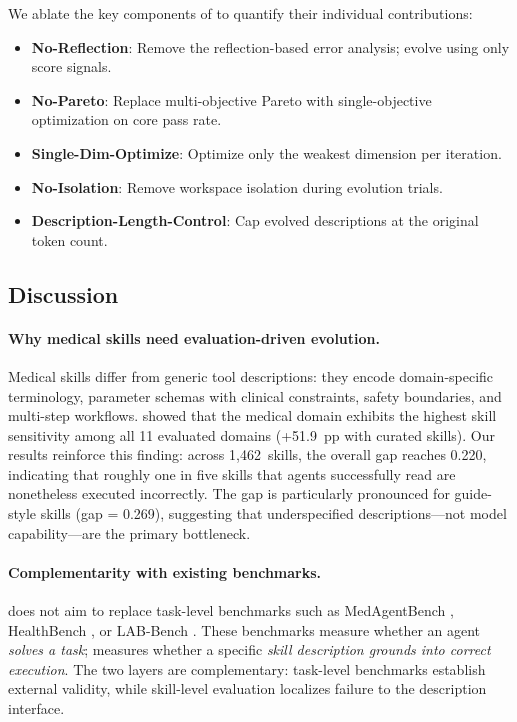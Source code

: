 We ablate the key components of \gepamed to quantify their individual contributions:
\begin{itemize}[nosep,leftmargin=*]
  \item \textbf{No-Reflection}: Remove the reflection-based error analysis; evolve using only score signals.
  \item \textbf{No-Pareto}: Replace multi-objective Pareto with single-objective optimization on core pass rate.
  \item \textbf{Single-Dim-Optimize}: Optimize only the weakest dimension per iteration.
  \item \textbf{No-Isolation}: Remove workspace isolation during evolution trials.
  \item \textbf{Description-Length-Control}: Cap evolved descriptions at the original token count.
\end{itemize}

\subsection{Discussion}
\label{ssec:discussion}

\paragraph{Why medical skills need evaluation-driven evolution.}
Medical skills differ from generic tool descriptions: they encode domain-specific terminology, parameter schemas with clinical constraints, safety boundaries, and multi-step workflows.
\citet{skillsbench2026} showed that the medical domain exhibits the highest skill sensitivity among all 11 evaluated domains (+51.9~pp with curated skills).
Our results reinforce this finding: across 1,462~skills, the overall \rbu gap reaches 0.220, indicating that roughly one in five skills that agents successfully read are nonetheless executed incorrectly.
The gap is particularly pronounced for guide-style skills (\rbu gap = 0.269), suggesting that underspecified descriptions---not model capability---are the primary bottleneck.

\paragraph{Complementarity with existing benchmarks.}
\medskille does not aim to replace task-level benchmarks such as MedAgentBench \citep{medagentbench2025}, HealthBench \citep{healthbench2025}, or LAB-Bench \citep{labbench2024}.
These benchmarks measure whether an agent \emph{solves a task}; \medskillbench measures whether a specific \emph{skill description grounds into correct execution}.
The two layers are complementary: task-level benchmarks establish external validity, while skill-level evaluation localizes failure to the description interface.

